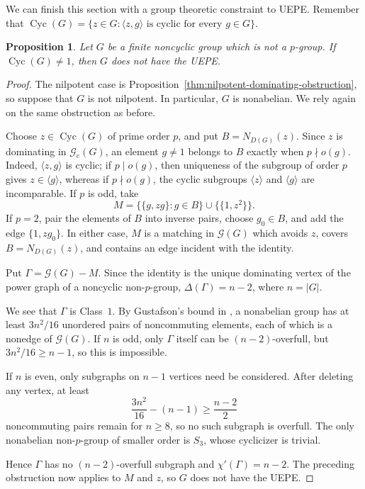 \documentclass{article}
\newtheorem{proposition}[theorem]{Proposition}
\theoremstyle{definition}
\theoremstyle{indentclaim}
\theoremstyle{named}
\theoremstyle{named}
\begin{document}
\medskip

We can finish this section with a group theoretic constraint to UEPE. Remember that $\operatorname{Cyc}(G)=\{z\in G:\langle z,g\rangle\text{ is cyclic for every }g\in G\}$. 

\begin{proposition}
\label{thm:general-cyclicizer-obstruction}
Let \(G\) be a finite noncyclic group which is not a \(p\)-group.  If
\(\operatorname{Cyc}(G)\ne1\), then \(G\) does not have the UEPE.
\end{proposition}


\begin{proof}
The nilpotent case is Proposition~\ref{thm:nilpotent-dominating-obstruction}, so
suppose that $G$ is not nilpotent. In particular, $G$ is nonabelian. We rely again on the same obstruction as before. 

Choose $z\in\operatorname{Cyc}(G)$ of prime order $p$, and put
$B=N_{D(G)}(z)$. Since $z$ is dominating in $\mathscr G_e(G)$, an element
$g\neq1$ belongs to $B$ exactly when $p\nmid o(g)$. Indeed,
$\langle z,g\rangle$ is cyclic; if $p\mid o(g)$, then uniqueness of the
subgroup of order $p$ gives $z\in\langle g\rangle$, whereas if
$p\nmid o(g)$, the cyclic subgroups $\langle z\rangle$ and $\langle g\rangle$
are incomparable. If $p$ is odd, take
\[
M=\bigl\{\{g,zg\}:g\in B\bigr\}\cup\bigl\{\{1,z^2\}\bigr\}.
\]
If $p=2$, pair the elements of $B$ into inverse pairs, choose $g_0\in B$,
and add the edge $\{1,zg_0\}$. In either case, $M$ is a matching in
$\mathscr G(G)$ which avoids $z$, covers $B=N_{D(G)}(z)$, and contains
an edge incident with the identity.

Put $\Gamma=\mathscr G(G)-M$. Since the identity is the unique dominating
vertex of the power graph of a noncyclic non-$p$-group,
$\Delta(\Gamma)=n-2$, where $n=|G|$.

We see that $\Gamma$ is Class~$1$. By Gustafson's bound in \cite{Gustafson1973},
a nonabelian group has at least $3n^2/16$ unordered pairs of
noncommuting elements, each of which is a nonedge of $\mathscr G(G)$.
If $n$ is odd, only $\Gamma$ itself can be $(n-2)$-overfull, but
$3n^2/16\ge n-1$, so this is impossible.

If $n$ is even, only subgraphs on $n-1$ vertices need be considered.
After deleting any vertex, at least
\[
\frac{3n^2}{16}-(n-1)\ge\frac{n-2}{2}
\]
noncommuting pairs remain for $n\ge8$, so no such subgraph is overfull.
The only nonabelian non-$p$-group of smaller order is $S_3$, whose
cyclicizer is trivial.

Hence $\Gamma$ has no $(n-2)$-overfull subgraph and $\chi'(\Gamma)=n-2$. The preceding obstruction now applies to $M$ and
$z$, so $G$ does not have the UEPE. 
\end{proof}
\end{document}
